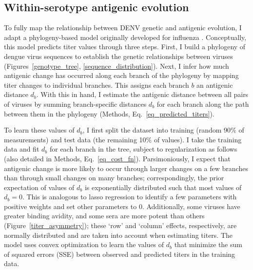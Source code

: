 \subsection{Within-serotype antigenic evolution}
To fully map the relationship between DENV genetic and antigenic evolution, I adapt a phylogeny-based model originally developed for influenza \citep{neher2016prediction}.
Conceptually, this model predicts titer values through three steps.
First, I build a phylogeny of dengue virus sequences to establish the genetic relationships between viruses (Figures~\ref{genotype_tree}, \ref{sequence_distribution}).
Next, I infer how much antigenic change has occurred along each branch of the phylogeny by mapping titer changes to individual branches.
This assigns each branch $b$ an antigenic distance $d_b$.
With this in hand, I estimate the antigenic distance between all pairs of viruses by summing branch-specific distances $d_b$ for each branch along the path between them in the phylogeny (Methods, Eq.~\ref{eq_predicted_titers}).

To learn these values of $d_b$, I first split the dataset into training (random 90\% of measurements) and test data (the remaining 10\% of values).
I take the training data and fit $d_b$ for each branch in the tree, subject to regularization as follows (also detailed in Methods, Eq.~\ref{eq_cost_fn}).
Parsimoniously, I expect that antigenic change is more likely to occur through larger changes on a few branches than through small changes on many branches; correspondingly, the prior expectation of values of $d_b$ is exponentially distributed such that most values of $d_b = 0$.
This is analogous to lasso regression to identify a few parameters with positive weights and set other parameters to 0.
Additionally, some viruses have greater binding avidity, and some sera are more potent than others (Figure~\ref{titer_asymmetry}); these `row' and `column' effects, respectively, are normally distributed and are taken into account when estimating titers.
The model uses convex optimization to learn the values of $d_b$ that minimize the sum of squared errors (SSE) between observed and predicted titers in the training data.

